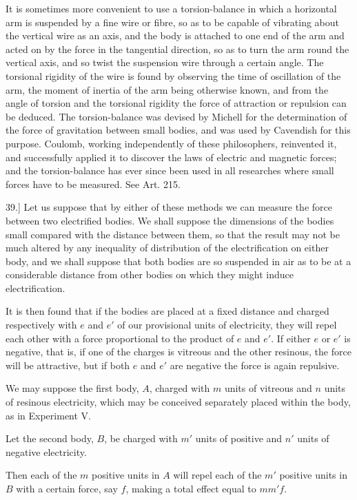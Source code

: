 \documentclass[11pt,a4paper]{article}
\begin{document}
It is sometimes more convenient to use a torsion-balance in which a
horizontal arm is suspended by a fine wire or fibre, so as to be capable
of vibrating about the vertical wire as an axis, and the body is attached
to one end of the arm and acted on by the force in the tangential
direction, so as to turn the arm round the vertical axis, and so twist
the suspension wire through a certain angle. The torsional rigidity of
the wire is found by observing the time of oscillation of the arm, the
moment of inertia of the arm being otherwise known, and from the angle
of torsion and the torsional rigidity the force of attraction or
repulsion can be deduced. The torsion-balance was devised by Michell for
the determination of the force of gravitation between small bodies, and
was used by Cavendish for this purpose. Coulomb, working independently
of these philosophers, reinvented it, and successfully applied it to
discover the laws of electric and magnetic forces; and the
torsion-balance has ever since been used in all researches where small
forces have to be measured. See Art. 215.

39.] Let us suppose that by either of these methods we can measure the
force between two electrified bodies. We shall suppose the dimensions of
the bodies small compared with the distance between them, so that the
result may not be much altered by any inequality of distribution of the
electrification on either body, and we shall suppose that both bodies
are so suspended in air as to be at a considerable distance from other
bodies on which they might induce electrification.

It is then found that if the bodies are placed at a fixed distance and
charged respectively with \(e\) and \(e'\) of our provisional units of
electricity, they will repel each other with a force proportional to the
product of \(e\) and \(e'\). If either \(e\) or \(e'\) is negative, that
is, if one of the charges is vitreous and the other resinous, the force
will be attractive, but if both \(e\) and \(e'\) are negative the force
is again repulsive.

We may suppose the first body, \(A\), charged with \(m\) units of
vitreous and \(n\) units of resinous electricity, which may be conceived
separately placed within the body, as in Experiment V.

Let the second body, \(B\), be charged with \(m'\) units of positive and
\(n'\) units of negative electricity.

Then each of the \(m\) positive units in \(A\) will repel each of the
\(m'\) positive units in \(B\) with a certain force, say \(f\), making a
total effect equal to \(m m' f\).
\end{document}
